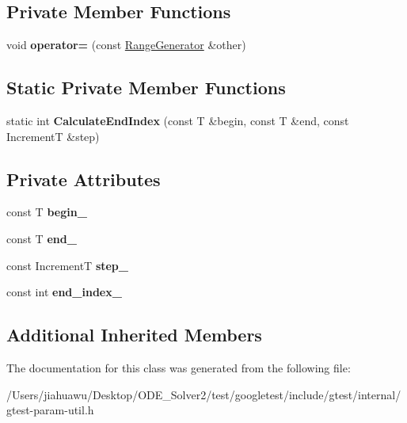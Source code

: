 \subsection*{Private Member Functions}
\begin{DoxyCompactItemize}
\item 
\mbox{\label{classtesting_1_1internal_1_1_range_generator_a00ef0f268e44d48d129a52bf0f9f9539}} 
void {\bfseries operator=} (const \mbox{\hyperlink{classtesting_1_1internal_1_1_range_generator}{Range\+Generator}} \&other)
\end{DoxyCompactItemize}
\subsection*{Static Private Member Functions}
\begin{DoxyCompactItemize}
\item 
\mbox{\label{classtesting_1_1internal_1_1_range_generator_af617ad3b3e40bef967f1055dc7ae8ae6}} 
static int {\bfseries Calculate\+End\+Index} (const T \&begin, const T \&end, const IncrementT \&step)
\end{DoxyCompactItemize}
\subsection*{Private Attributes}
\begin{DoxyCompactItemize}
\item 
\mbox{\label{classtesting_1_1internal_1_1_range_generator_af16307fd21766bcbb973d8b3335f1a3f}} 
const T {\bfseries begin\+\_\+}
\item 
\mbox{\label{classtesting_1_1internal_1_1_range_generator_ac36eecbaf80b51a59d59a4a4fdf5b5db}} 
const T {\bfseries end\+\_\+}
\item 
\mbox{\label{classtesting_1_1internal_1_1_range_generator_ae7f3c4b76d8610f030fdd12285ebd8fb}} 
const IncrementT {\bfseries step\+\_\+}
\item 
\mbox{\label{classtesting_1_1internal_1_1_range_generator_a336878a1871133e49665df60ea944076}} 
const int {\bfseries end\+\_\+index\+\_\+}
\end{DoxyCompactItemize}
\subsection*{Additional Inherited Members}


The documentation for this class was generated from the following file\+:\begin{DoxyCompactItemize}
\item 
/\+Users/jiahuawu/\+Desktop/\+O\+D\+E\+\_\+\+Solver2/test/googletest/include/gtest/internal/gtest-\/param-\/util.\+h\end{DoxyCompactItemize}
